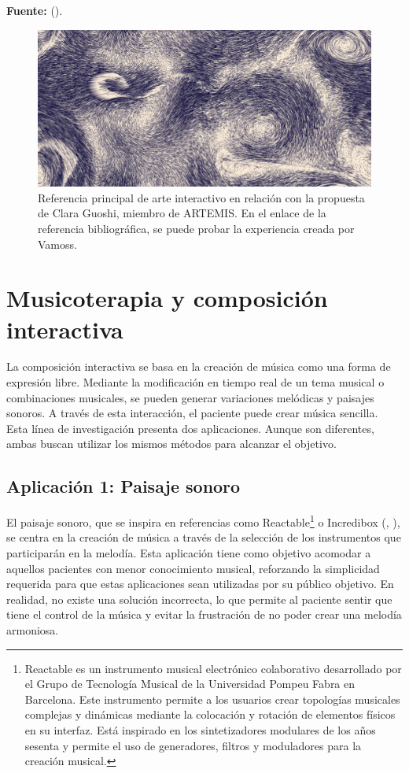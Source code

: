 \begin{center}
	\textbf{Fuente:} \citeauthor{VAMOSS:2023} (\citeyear{VAMOSS:2023}).
	\vspace{-18pt}
\end{center}

\begin{figure}[h!]
	\centering
	\includegraphics[width=0.4\linewidth]{Figuras/Desarrollo/MarParticulas.png}
	\caption[Referencia principal de arte interactivo Vamoss.]{Referencia principal de arte interactivo en relación con la propuesta de Clara Guoshi, miembro de ARTEMIS. En el enlace de la referencia bibliográfica, se puede probar la experiencia creada por Vamoss.}
	\label{fig:SeaParticles}
\end{figure}

\section{Musicoterapia y composición interactiva}

La composición interactiva se basa en la creación de música como una forma de expresión libre. Mediante la modificación en tiempo real de un tema musical o combinaciones musicales, se pueden generar variaciones melódicas y paisajes sonoros. A través de esta interacción, el paciente puede crear música sencilla. Esta línea de investigación presenta dos aplicaciones. Aunque son diferentes, ambas buscan utilizar los mismos métodos para alcanzar el objetivo.

\subsection{Aplicación 1: Paisaje sonoro}

El paisaje sonoro, que se inspira en referencias como Reactable\footnote{Reactable es un instrumento musical electrónico colaborativo desarrollado por el Grupo de Tecnología Musical de la Universidad Pompeu Fabra en Barcelona. Este instrumento permite a los usuarios crear topologías musicales complejas y dinámicas mediante la colocación y rotación de elementos físicos en su interfaz. Está inspirado en los sintetizadores modulares de los años sesenta y permite el uso de generadores, filtros y moduladores para la creación musical.} o Incredibox (\citeauthor{INCREDIBOX:2023}, \citeyear{INCREDIBOX:2023}), se centra en la creación de música a través de la selección de los instrumentos que participarán en la melodía. Esta aplicación tiene como objetivo acomodar a aquellos pacientes con menor conocimiento musical, reforzando la simplicidad requerida para que estas aplicaciones sean utilizadas por su público objetivo. En realidad, no existe una solución incorrecta, lo que permite al paciente sentir que tiene el control de la música y evitar la frustración de no poder crear una melodía armoniosa.

